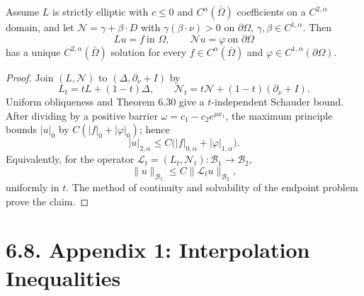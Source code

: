 \begin{theorem}
\label{gt-ch06-thm-6-31}
Assume $L$ is strictly elliptic with $c\le0$ and $C^\alpha(\bar\Omega)$
coefficients on a $C^{2,\alpha}$ domain, and let
$\mathcal N=\gamma+\beta\cdot D$ with $\gamma(\beta\cdot\nu)>0$ on $\partial\Omega$,
$\gamma,\beta\in C^{1,\alpha}$.  Then
\begin{equation}\tag{6.78}
Lu=f\ \text{in }\Omega,\qquad \mathcal Nu=\varphi\ \text{on }\partial\Omega
\end{equation}
has a unique $C^{2,\alpha}(\bar\Omega)$ solution for every
$f\in C^\alpha(\bar\Omega)$ and $\varphi\in C^{1,\alpha}(\partial\Omega)$.
\end{theorem}
\begin{proof}
\sketch Join $(L,\mathcal N)$ to $(\Delta,\partial_\nu+I)$ by
\begin{equation}\tag{6.79}
L_t=tL+(1-t)\Delta,\qquad \mathcal N_t=t\mathcal N+(1-t)(\partial_\nu+I).
\end{equation}
Uniform obliqueness and Theorem 6.30 give a $t$-independent Schauder bound.
After dividing by a positive barrier $\omega=c_1-c_2e^{\mu x_1}$, the maximum
principle bounds $|u|_0$ by $C(|f|_0+|\varphi|_0)$; hence
\begin{equation}\tag{6.80}
|u|_{2,\alpha}\le C\bigl(|f|_{0,\alpha}+|\varphi|_{1,\alpha}\bigr).
\end{equation}
Equivalently, for the operator
$\mathcal L_t=(L_t,\mathcal N_t):\mathscr B_1\to\mathscr B_2$,
\begin{equation}
\tag{6.81}
\|u\|_{\mathscr B_1}\leq C\|\mathcal L_tu\|_{\mathscr B_2},
\end{equation}
uniformly in $t$.
The method of continuity and solvability of the endpoint problem prove the claim.
\end{proof}

\section*{6.8. Appendix 1: Interpolation Inequalities}


